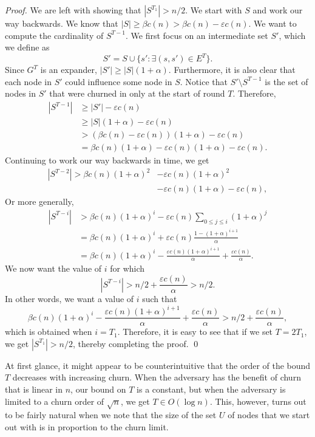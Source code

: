 \documentclass[leqno,11pt]{article}
\renewcommand{\ge}{\geqslant}
\renewcommand{\le}{\leqslant}
\newcommand{\set}[1]{\{#1\}}
\newcommand{\eps}{\varepsilon}
\begin{document}
{\begin{proof}
We are left with showing that $|S^{T_1}| > n/2$.
We start with $S$ and work our way backwards. We know that $|S| \ge \beta c(n) >
\beta c(n) - \eps c(n)$. We want to compute the cardinality of $S^{T-1}$. We
first focus on an intermediate set $S'$, which we define as 
\begin{equation*}S'= S \cup \set{s': \exists (s,s') \in E^T}.\end{equation*} 
Since $G^T$ is an expander, $|S'| \ge |S|(1+\alpha)$. 
Furthermore, it is also clear that each node in $S'$ could influence some node in $S$. 
Notice that $ S' \setminus S^{T-1}$ is the set of nodes in $S'$ that were churned in only at the start of round $T$. 
Therefore, 
\begin{align*}
|S^{T-1}| &\ge |S'| - \eps c(n) \\
&\ge |S|(1+\alpha) - \eps c(n) \\
&> (\beta c(n) - \eps c(n))(1+\alpha) - \eps c(n) \\
&= \beta c(n)(1+\alpha) - \eps c(n)(1+\alpha) - \eps c(n).
\end{align*}
Continuing to work our way backwards in time, we get
\begin{align*}
|S^{T-2}| > \beta c(n)(1+\alpha)^2 &- \eps c(n)(1+\alpha)^2\\ 
                                   &- \eps c(n)(1+\alpha) - \eps c(n),
\end{align*}
Or more generally,
\begin{align*}
|S^{T-i}| &> \beta c(n)(1+\alpha)^i - \eps c(n) \sum_{0 \le j \le i} (1+\alpha)^j \\
&= \beta c(n)(1+\alpha)^i + \eps c(n) \frac{1 - (1+\alpha)^{i+1}}{\alpha}\\
&= \beta c(n)(1+\alpha)^i  - \frac{\eps c(n) (1+\alpha)^{i+1}}{\alpha} + \frac{\eps c(n)}{\alpha}.
\end{align*}
We now want the value of $i$ for which \begin{equation*}|S^{T-i}|  > n/2 + \frac{\eps
c(n)}{\alpha} > n/2.\end{equation*} In other words, we want a value of $i$ such that
\[
\beta c(n)(1+\alpha)^i  - \frac{\eps c(n) (1+\alpha)^{i+1}}{\alpha} + \frac{\eps c(n)}{\alpha} > n/2 + \frac{\eps c(n)}{\alpha},
\]
which is obtained when $i = T_1$. Therefore, it is
easy to see that if we set $T = 2 T_1 $, we get $|S^{T_1}|
> n/2$, thereby completing the proof. 
\qed
\end{proof}
}
At  first glance, it might appear to be counterintuitive that the order of the
bound $T$ decreases with increasing churn. When the adversary has the benefit of churn that is linear in $n$, our bound on $T$ is a constant, but when the adversary is limited to a churn order of $\sqrt{n}$, we get 
$T \in O(\log n)$. This, however, turns out to be fairly
natural when we note that the size of the set $U$ of nodes that we start out with is in proportion to the churn limit.
\end{document}
